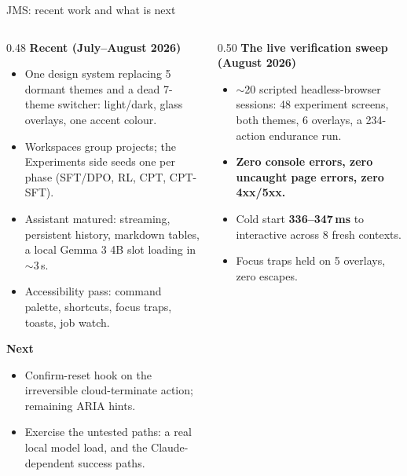\documentclass[aspectratio=169,11pt]{beamer}
\newcommand{\good}[1]{\textcolor{jsAccent}{\textbf{#1}}}
\begin{document}
\begin{frame}{JMS: recent work and what is next}
  \scriptsize
  \begin{columns}[T]
    \begin{column}{0.48\textwidth}
      \textbf{Recent (July--August 2026)}
      \begin{itemize}
        \item One design system replacing 5 dormant themes and a dead 7-theme switcher: light/dark, glass overlays, one accent colour.
        \item Workspaces group projects; the Experiments side seeds one per phase (SFT/DPO, RL, CPT, CPT-SFT).
        \item Assistant matured: streaming, persistent history, markdown tables, a local Gemma 3 4B slot loading in $\sim$3\,s.
        \item Accessibility pass: command palette, shortcuts, focus traps, toasts, job watch.
      \end{itemize}
      \vspace{0.2em}
      \textbf{Next}
      \begin{itemize}
        \item Confirm-reset hook on the irreversible cloud-terminate action; remaining ARIA hints.
        \item Exercise the untested paths: a real local model load, and the Claude-dependent success paths.
      \end{itemize}
    \end{column}
    \begin{column}{0.50\textwidth}
      \textbf{The live verification sweep (August 2026)}
      \begin{itemize}
        \item $\sim$20 scripted headless-browser sessions: 48 experiment screens, both themes, 6 overlays, a 234-action endurance run.
        \item \good{Zero console errors, zero uncaught page errors, zero 4xx/5xx.}
        \item Cold start \textbf{336--347\,ms} to interactive across 8 fresh contexts.
        \item Focus traps held on 5 overlays, zero escapes.
      \end{itemize}
    \end{column}
  \end{columns}
\end{frame}
\end{document}
